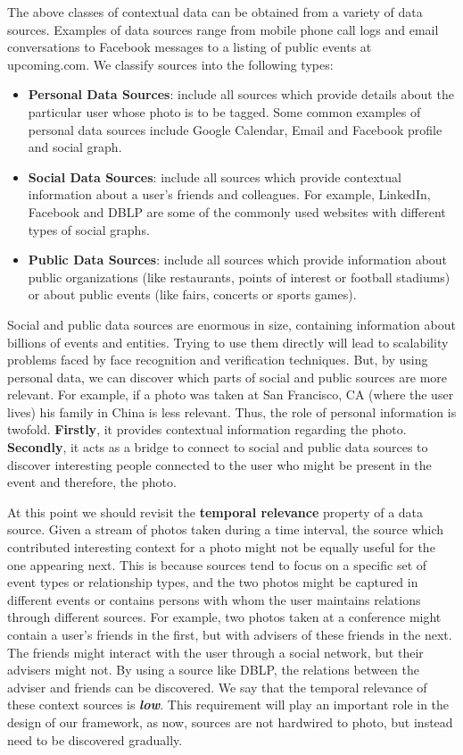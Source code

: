 The above classes of contextual data can be obtained from a variety of data sources. Examples of data sources range from mobile phone call logs and email conversations to Facebook messages to a listing of public events at upcoming.com. We classify sources into the following types:

\begin{itemize}
\item \textbf{Personal Data Sources}: include all sources which provide details about the particular user whose photo is to be tagged. Some common examples of personal data sources include Google Calendar, Email and Facebook profile and social graph.
\item \textbf{Social Data Sources}: include all sources which provide contextual information about a user's friends and colleagues. For example, LinkedIn, Facebook and DBLP are some of the commonly used websites with different types of social graphs.
\item \textbf{Public Data Sources}: include all sources which provide information about public organizations (like restaurants, points of interest or football stadiums) or about public events (like fairs, concerts or sports games).
\end{itemize}

Social and public data sources are enormous in size, containing information about billions of events and entities. Trying to use them directly will lead to scalability problems faced by face recognition and verification techniques. But, by using personal data, we can discover which parts of social and public sources are more relevant. For example, if a photo was taken at San Francisco, CA (where the user lives) his family in China is less relevant. Thus, the role of personal information is twofold. \textbf{Firstly}, it provides contextual information regarding the photo. \textbf{Secondly}, it acts as a bridge to connect to social and public data sources to discover interesting people connected to the user who might be present in the event and therefore, the photo.

At this point we should revisit the \textbf{temporal relevance} property of a data source. Given a stream of photos taken during a time interval, the source which contributed interesting context for a photo might not be equally useful for the one appearing next. This is because sources tend to focus on a specific set of event types or relationship types, and the two photos might be captured in different events or contains persons with whom the user maintains relations through different sources. For example, two photos taken at a conference might contain a user's friends in the first, but with advisers of these friends in the next. The friends might interact with the user through a social network, but their advisers might not. By using a source like DBLP, the relations between the adviser and friends can be discovered. We say that the temporal relevance of these context sources is \textbf{\textit{low}}. This requirement will play an important role in the design of our framework, as now, sources are not hardwired to photo, but instead need to be discovered gradually.

